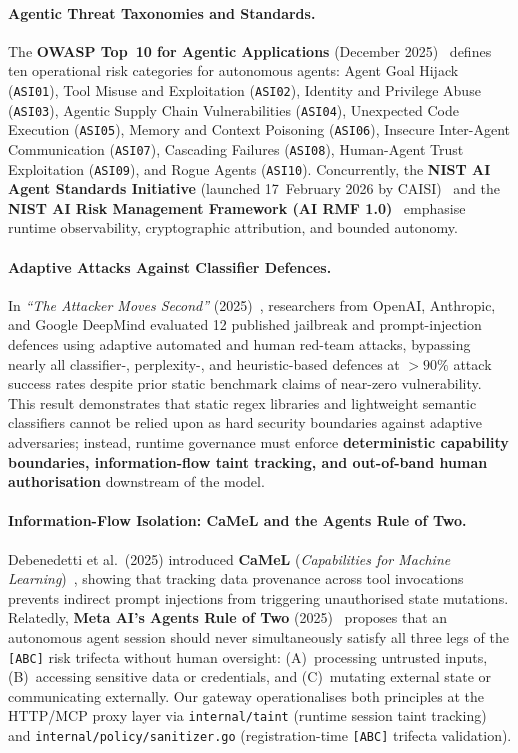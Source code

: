\documentclass[11pt, a4paper]{article}
\begin{document}
\paragraph{Agentic Threat Taxonomies and Standards.}
The \textbf{OWASP Top~10 for Agentic Applications} (December 2025)~\cite{owasp_agentic2025} defines ten operational risk categories for autonomous agents: Agent Goal Hijack (\texttt{ASI01}), Tool Misuse and Exploitation (\texttt{ASI02}), Identity and Privilege Abuse (\texttt{ASI03}), Agentic Supply Chain Vulnerabilities (\texttt{ASI04}), Unexpected Code Execution (\texttt{ASI05}), Memory and Context Poisoning (\texttt{ASI06}), Insecure Inter-Agent Communication (\texttt{ASI07}), Cascading Failures (\texttt{ASI08}), Human-Agent Trust Exploitation (\texttt{ASI09}), and Rogue Agents (\texttt{ASI10}). Concurrently, the \textbf{NIST AI Agent Standards Initiative} (launched 17~February 2026 by CAISI)~\cite{nist_agent2026} and the \textbf{NIST AI Risk Management Framework (AI RMF 1.0)}~\cite{nist} emphasise runtime observability, cryptographic attribution, and bounded autonomy.

\paragraph{Adaptive Attacks Against Classifier Defences.}
In \emph{``The Attacker Moves Second''} (2025)~\cite{nasr2025}, researchers from OpenAI, Anthropic, and Google DeepMind evaluated 12 published jailbreak and prompt-injection defences using adaptive automated and human red-team attacks, bypassing nearly all classifier-, perplexity-, and heuristic-based defences at $>90\%$ attack success rates despite prior static benchmark claims of near-zero vulnerability. This result demonstrates that static regex libraries and lightweight semantic classifiers cannot be relied upon as hard security boundaries against adaptive adversaries; instead, runtime governance must enforce \textbf{deterministic capability boundaries, information-flow taint tracking, and out-of-band human authorisation} downstream of the model.

\paragraph{Information-Flow Isolation: CaMeL and the Agents Rule of Two.}
Debenedetti et al.\ (2025) introduced \textbf{CaMeL} (\emph{Capabilities for Machine Learning})~\cite{camel2025}, showing that tracking data provenance across tool invocations prevents indirect prompt injections from triggering unauthorised state mutations. Relatedly, \textbf{Meta AI's Agents Rule of Two} (2025)~\cite{meta_ruleoftwo2025} proposes that an autonomous agent session should never simultaneously satisfy all three legs of the \texttt{[ABC]} risk trifecta without human oversight: (A)~processing untrusted inputs, (B)~accessing sensitive data or credentials, and (C)~mutating external state or communicating externally. Our gateway operationalises both principles at the HTTP/MCP proxy layer via \texttt{internal/taint} (runtime session taint tracking) and \texttt{internal/policy/sanitizer.go} (registration-time \texttt{[ABC]} trifecta validation).
\end{document}
